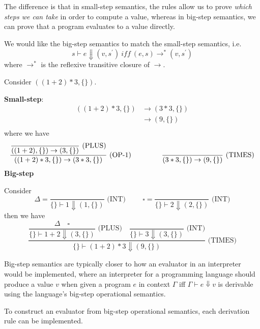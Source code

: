 The difference is that in small-step semantics, the rules allow us to prove \textit{which steps we can take} in order to compute a value, whereas in big-step semantics, we can prove that a program evaluates to a value directly. 

We would like the big-step semantics to match the small-step semantics, i.e.
\[
  s \vdash e \Downarrow (v, s^{\prime}) \ \textit{iff} \ (e, s) \to^* (v, s^{\prime})
\]
where \(\to^*\) is the reflexive transitive closure of \(\to\). 

\begin{eg}
Consider \(((1 + 2) * 3, \{\})\). 

\textbf{Small-step}:
\[
  \begin{aligned}
    ((1 + 2) * 3, \{\}) &\to (3 * 3, \{\}) \\
    &\to (9, \{\}) \\
  \end{aligned}
\]
where we have
\[
  \dfrac{\dfrac{}{((1 + 2), \{\}) \to (3, \{\})} \text{ (PLUS)}}{((1 + 2) * 3, \{\}) \to (3 * 3, \{\})} \text{ (OP-1)} 
  \hspace{1.5cm} 
  \dfrac{}{(3 * 3, \{\}) \to (9, \{\})} \text{ (TIMES)}
\]
\textbf{Big-step}

Consider 
\[
  \Delta = \dfrac{}{\{\} \vdash 1 \Downarrow (1, \{\})} \text{ (INT)} 
  \hspace{1cm} 
  \square = \dfrac{}{\{\} \vdash 2 \Downarrow (2, \{\})} \text{ (INT)}
\]
then we have
\[
  \dfrac{
    \dfrac{\Delta \quad \square}{\{\} \vdash 1 + 2 \Downarrow (3, \{\})} \text{ (PLUS)}
    \quad
    \dfrac{}{\{\} \vdash 3 \Downarrow (3, \{\})} \text{ (INT)}
  }{
    \{\} \vdash (1 + 2) * 3 \Downarrow (9, \{\})
  } \text{ (TIMES)}
\]
\end{eg}

Big-step semantics are typically closer to how an evaluator in an interpreter would be implemented, where an interpreter for a programming language should produce a value \(v\) when given a program \(e\) in context \(\Gamma\) iff \(\Gamma \vdash e \Downarrow v\) is derivable using the language's big-step operational semantics. 

To construct an evaluator from big-step operational semantics, each derivation rule can be implemented. 

